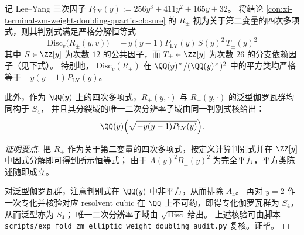 \begin{conclusion}\label{con:xi-terminal-zm-weight-doubling-disc-squareclass}
记 Lee--Yang 三次因子
\(
P_{\mathrm{LY}}(y):=256y^{3}+411y^{2}+165y+32
\)。
将结论 \ref{con:xi-terminal-zm-weight-doubling-quartic-closure} 的 \(R_{\pm}\) 视为关于第二变量的四次多项式，则其判别式满足严格分解恒等式
\[
\boxed{\;
\mathrm{Disc}_{v}\bigl(R_{\pm}(y,v)\bigr)
=-\,y(y-1)P_{\mathrm{LY}}(y)\,S(y)^{2}\,T_{\pm}(y)^{2}\;}
\]
其中 \(S\in\ZZ[y]\) 为次数 \(12\) 的公共因子，而 \(T_{\pm}\in\ZZ[y]\) 为次数 \(26\) 的分支依赖因子（见下式）。
特别地，
\(
\mathrm{Disc}_{v}(R_{\pm})
\)
在 \(\QQ(y)^{\times}/(\QQ(y)^{\times})^{2}\) 中的平方类均严格等于 \(-y(y-1)P_{\mathrm{LY}}(y)\)。

\par
此外，作为 \(\QQ(y)\) 上的四次多项式，\(R_{+}(y,\cdot)\) 与 \(R_{-}(y,\cdot)\) 的泛型伽罗瓦群均同构于 \(S_{4}\)，
并且其分裂域的唯一二次分辨率子域由同一判别式核给出：
\[
\QQ(y)\Bigl(\sqrt{-y(y-1)P_{\mathrm{LY}}(y)}\Bigr).
\]
\end{conclusion}
\begin{proof}[证明要点]
把 \(R_{\pm}\) 作为关于第二变量的四次多项式，按定义计算判别式并在 \(\ZZ[y]\) 中因式分解即可得到所示恒等式；
由于 \(A(y)^{2}B_{\pm}(y)^{2}\) 为完全平方，平方类陈述随即成立。
\par
对泛型伽罗瓦群，注意判别式在 \(\QQ(y)\) 中非平方，从而排除 \(A_{4}\)。
再对 \(y=2\) 作一次专化并核验对应 resolvent cubic 在 \(\QQ\) 上不可约，即得专化伽罗瓦群为 \(S_{4}\)，从而泛型亦为 \(S_{4}\)；
唯一二次分辨率子域由 \(\sqrt{\mathrm{Disc}}\) 给出。
上述核验可由脚本 \texttt{scripts/exp\_fold\_zm\_elliptic\_weight\_doubling\_audit.py} 复核。证毕。
\end{proof}

